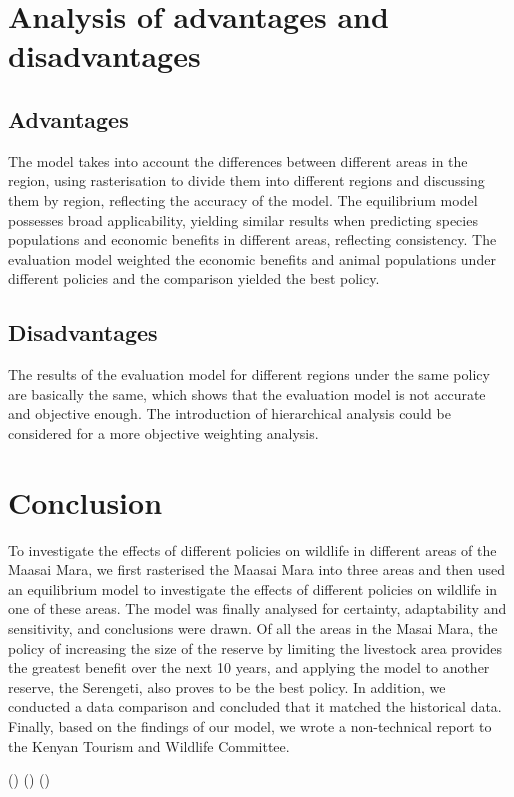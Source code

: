 \documentclass{mcmthesis}
\numberwithin{figure}{section}
\numberwithin{table}{section}
\numberwithin{equation}{section}
\begin{document}
\section{Analysis of advantages and disadvantages}
\subsection{Advantages}
The model takes into account the differences between different areas in the region, using rasterisation to divide them into different regions and discussing them by region, reflecting the accuracy of the model.
The equilibrium model possesses broad applicability, yielding similar results when predicting species populations and economic benefits in different areas, reflecting consistency.
The evaluation model weighted the economic benefits and animal populations under different policies and the comparison yielded the best policy.
\subsection{Disadvantages}
The results of the evaluation model for different regions under the same policy are basically the same, which shows that the evaluation model is not accurate and objective enough. The introduction of hierarchical analysis could be considered for a more objective weighting analysis.

\section{Conclusion}

To investigate the effects of different policies on wildlife in different areas of the Maasai Mara, we first rasterised the Maasai Mara into three areas and then used an equilibrium model to investigate the effects of different policies on wildlife in one of these areas. The model was finally analysed for certainty, adaptability and sensitivity, and conclusions were drawn. Of all the areas in the Masai Mara, the policy of increasing the size of the reserve by limiting the livestock area provides the greatest benefit over the next 10 years, and applying the model to another reserve, the Serengeti, also proves to be the best policy. In addition, we conducted a data comparison and concluded that it matched the historical data. Finally, based on the findings of our model, we wrote a non-technical report to the Kenyan Tourism and Wildlife Committee.

\newpage()
\newpage()
\newpage()
\end{document}
